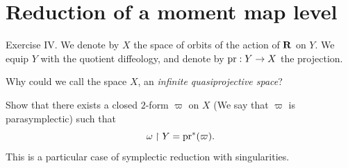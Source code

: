 \section{Reduction of a moment map level}

\begin{Article}{Exercise IV.}{}
  \label{quasiprojective-space-reduction}
  We denote by $X$ the space of orbits of the action of $\mathbf{R}$ on $Y$.
  We equip $Y$ with the quotient diffeology,
  and denote by $\operatorname{pr} : Y \to X$ the
  projection.
  
   Why could we call the space $X$, an {\em infinite quasiprojective space}?
  
   Show that there exists a closed $2$-form $\varpi$ on $X$ (We say that $\varpi$ is parasymplectic) such that
  $$
    \omega \restriction Y = \operatorname{pr}^*(\varpi).
    $$
  This is a particular case of symplectic reduction with singularities.
\end{Article}

